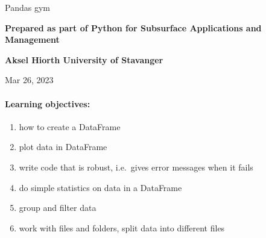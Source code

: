 \documentclass[%
twoside,                 %
final,                   %
10pt]{article}
\begin{document}

\newcommand{\exercisesection}[1]{\subsection*{#1}}







\thispagestyle{empty}

\begin{center}
{\LARGE\bf
\begin{spacing}{1.25}
Pandas gym
\end{spacing}
}
\end{center}


\begin{center}
{\bf Prepared as part of Python for Subsurface Applications and Management${}^{}$} \\ [0mm]
\end{center}


\begin{center}
{\bf Aksel Hiorth University of Stavanger${}^{}$} \\ [0mm]
\end{center}

\begin{center}
\end{center}
    

\begin{center}
Mar 26, 2023
\end{center}

\vspace{1cm}


\paragraph{Learning objectives:}

\begin{enumerate}
\item how to create a DataFrame

\item plot data in DataFrame

\item write code that is robust, i.e.~gives error messages when it fails

\item do simple statistics on data in a DataFrame

\item group and filter data

\item work with files and folders, split data into different files
\end{enumerate}
\end{document}

